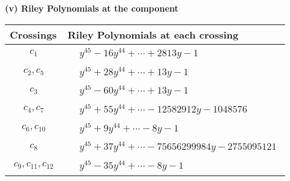 \documentclass[1p]{elsarticle_modified}
\theoremstyle{definition}
\begin{document}
\flushleft \textbf{(v) Riley Polynomials at the component}\newline \\
\begin{tabular}{m{50pt}|m{274pt}}
Crossings & \hspace{64pt}Riley Polynomials at each crossing \\
\hline $$\begin{aligned}c_{1}\end{aligned}$$&$\begin{aligned}
&y^{45}-16 y^{44}+\cdots+2813 y-1
\end{aligned}$\\
\hline $$\begin{aligned}c_{2},c_{5}\end{aligned}$$&$\begin{aligned}
&y^{45}+28 y^{44}+\cdots+13 y-1
\end{aligned}$\\
\hline $$\begin{aligned}c_{3}\end{aligned}$$&$\begin{aligned}
&y^{45}-60 y^{44}+\cdots+13 y-1
\end{aligned}$\\
\hline $$\begin{aligned}c_{4},c_{7}\end{aligned}$$&$\begin{aligned}
&y^{45}+55 y^{44}+\cdots-12582912 y-1048576
\end{aligned}$\\
\hline $$\begin{aligned}c_{6},c_{10}\end{aligned}$$&$\begin{aligned}
&y^{45}+9 y^{44}+\cdots-8 y-1
\end{aligned}$\\
\hline $$\begin{aligned}c_{8}\end{aligned}$$&$\begin{aligned}
&y^{45}+37 y^{44}+\cdots-75656299984 y-2755095121
\end{aligned}$\\
\hline $$\begin{aligned}c_{9},c_{11},c_{12}\end{aligned}$$&$\begin{aligned}
&y^{45}-35 y^{44}+\cdots-8 y-1
\end{aligned}$\\
\hline
\end{tabular}\\~\\
\end{document}
